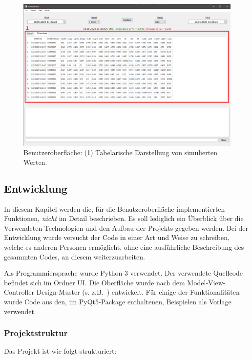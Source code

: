 \begin{figure}[H]
  \centering
  \includegraphics[width=\textwidth]{./img/ui_simulated_table}
  \caption{Benutzeroberfläche: (1) Tabelarische Darstellung von simulierten Werten.}\label{fig:ui_table}
\end{figure}

\subsection{Entwicklung}\label{sec:bo_entwicklung}
In diesem Kapitel werden die, für die Benutzeroberfläche implementierten Funktionen, \emph{nicht} im Detail beschrieben. Es soll lediglich ein Überblick über die Verwendeten Technologien und den Aufbau der Projekts gegeben werden. Bei der Entwicklung wurde versucht der Code in einer Art und Weise zu schreiben, welche es anderen Personen ermöglicht, ohne eine ausführliche Beschreibung des gesammten Codes, an diesem weiterzuarbeiten.

Als Programmiersprache wurde Python 3 verwendet. Der verwendete Quellcode befindet sich im Ordner \textrm{UI}. Die Oberfläche wurde nach dem Model-View-Controller Design-Muster (s. z.B.~\cite{deacon09}) entwickelt. Für einige der Funktionalitäten wurde Code aus den, im PyQt5-Package enthaltenen, Beispielen als Vorlage verwendet.

\subsubsection*{Projektstruktur}
Das Projekt ist wie folgt strukturiert:

